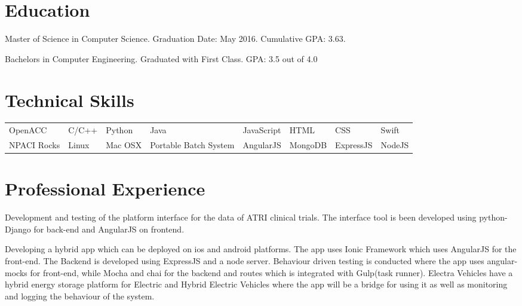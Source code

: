 \documentclass{Mihir_Kavatkar-Resume}
\begin{document}
	
	\section{Education}
		\educationinfoMasters
		{Master of Science in Computer Science.}
		{Graduation Date: May 2016.}
		{Cumulative GPA: 3.63.}
		
		\vspace*{-0.5em}
		\educationinfoBachelors
		{Bachelors in Computer Engineering. Graduated with First Class. GPA: 3.5 out of 4.0}
		
	
	\section{Technical Skills}
		\begin{tabular}{l l l l l l l l}
			OpenACC & C/C++ & Python & Java & JavaScript & HTML & CSS & Swift \\
			NPACI Rocks & Linux & Mac OSX & Portable Batch System & AngularJS & MongoDB &  ExpressJS & NodeJS
		\end{tabular}
	
	\section{Professional Experience}
		\vspace*{-0.5em}
		\workitems
		{Development and testing of the platform interface for the data of ATRI clinical trials.}
		{The interface tool is been developed using python-Django for back-end and AngularJS on frontend.}
		
		\vspace*{-0.5em}
		\workitems
		{Developing a hybrid app which can be deployed on ios and android platforms. The app uses Ionic Framework which uses AngularJS for the front-end. The Backend is developed using ExpressJS and a node server. Behaviour driven testing is conducted where the app uses angular-mocks for front-end, while Mocha and chai for the backend and routes which is integrated with Gulp(task runner).}
		{Electra Vehicles have a hybrid energy storage platform for Electric and Hybrid Electric Vehicles where the app will be a bridge for using it as well as monitoring and logging the behaviour of the system.}
		
\end{document}
